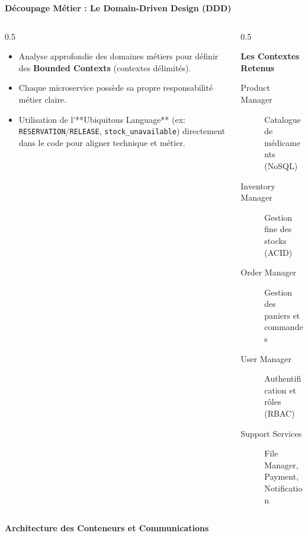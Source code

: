 \documentclass[10pt,aspectratio=169]{beamer}
\begin{document}
\begin{frame}{\textbf{Découpage Métier : Le Domain-Driven Design (DDD)}}
    \begin{columns}
        \begin{column}{0.5\textwidth}
            \begin{itemize}
                \item Analyse approfondie des domaines métiers pour définir des \textbf{Bounded Contexts} (contextes délimités).
                \item Chaque microservice possède sa propre responsabilité métier claire.
                \item Utilisation de l'**Ubiquitous Language** (ex: \texttt{RESERVATION}/\texttt{RELEASE}, \texttt{stock\_unavailable}) directement dans le code pour aligner technique et métier.
            \end{itemize}
        \end{column}
        \begin{column}{0.5\textwidth}
            \begin{block}{\textbf{Les Contextes Retenus}}
                \begin{description}
                    \item[Product Manager] Catalogue de médicaments (NoSQL)
                    \item[Inventory Manager] Gestion fine des stocks (ACID)
                    \item[Order Manager] Gestion des paniers et commandes
                    \item[User Manager] Authentification et rôles (RBAC)
                    \item[Support Services] File Manager, Payment, Notification
                \end{description}
            \end{block}
        \end{column}
    \end{columns}
\end{frame}

\begin{frame}{\textbf{Architecture des Conteneurs et Communications}}
    \begin{center}
        \resizebox{!}{0.7\textheight}{
            
        }
    \end{center}
\end{frame}
\end{document}
